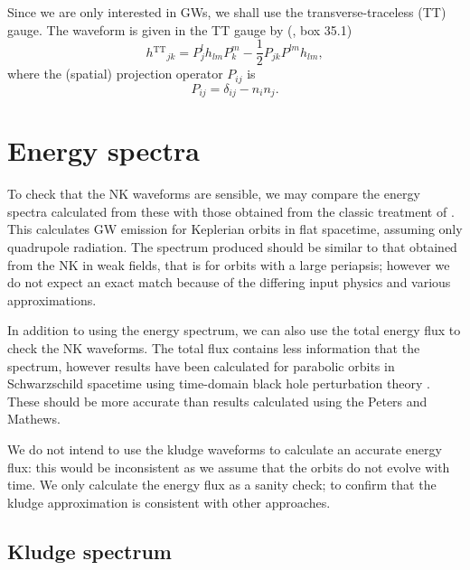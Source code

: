 \documentclass[useAMS,usedcolumn,usegraphicx,usenatbib]{mn2e}
\newcommand{\super}[1]{\ensuremath{^\mathrm{#1}}}
\newcommand{\recip}[1]{\ensuremath{\frac{1}{#1}}}
\begin{document}
Since we are only interested in GWs, we shall use the transverse-traceless (TT) gauge. The waveform is given in the TT gauge by (\citealt{Misner1973}, box 35.1)
\begin{equation}
h\super{TT}_{jk} = P^l_jh_{lm}P^m_k - \recip{2}P_{jk}P^{lm}h_{lm},
\end{equation}
where the (spatial) projection operator $P_{ij}$ is
\begin{equation}
P_{ij} = \delta_{ij} - n_in_j.
\end{equation}

\section{Energy spectra}\label{sec:Energy}

To check that the NK waveforms are sensible, we may compare the energy spectra calculated from these with those obtained from the classic treatment of \citet{Peters1963, Peters1964}. This calculates GW emission for Keplerian orbits in flat spacetime, assuming only quadrupole radiation. The spectrum produced should be similar to that obtained from the NK in weak fields, that is for orbits with a large periapsis; however we do not expect an exact match because of the differing input physics and various approximations.

In addition to using the energy spectrum, we can also use the total energy flux to check the NK waveforms. The total flux contains less information that the spectrum, however results have been calculated for parabolic orbits in Schwarzschild spacetime using time-domain black hole perturbation theory \citep{Martel2004}. These should be more accurate than results calculated using the Peters and Mathews.

We do not intend to use the kludge waveforms to calculate an accurate energy flux: this would be inconsistent as we assume that the orbits do not evolve with time. We only calculate the energy flux as a sanity check; to confirm that the kludge approximation is consistent with other approaches.

\subsection{Kludge spectrum}
\end{document}
